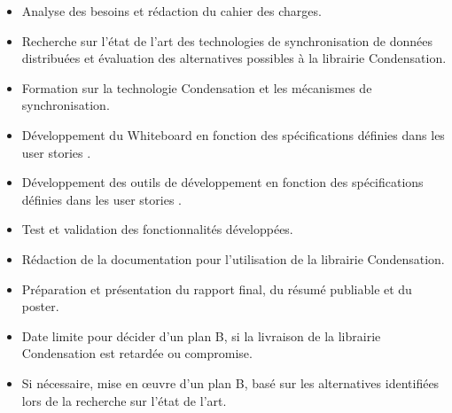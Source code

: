 \begin{itemize}
    \item Analyse des besoins et rédaction du cahier des charges.
    \item Recherche sur l'état de l'art des technologies de synchronisation de données distribuées et évaluation des alternatives possibles à la librairie Condensation.
    \item Formation sur la technologie Condensation et les mécanismes de synchronisation.
    \item Développement du Whiteboard en fonction des spécifications définies dans les user stories .
    \item Développement des outils de développement en fonction des spécifications définies dans les user stories .
    \item Test et validation des fonctionnalités développées.
    \item Rédaction de la documentation pour l'utilisation de la librairie Condensation.
    \item Préparation et présentation du rapport final, du résumé publiable et du poster.
    \item Date limite pour décider d'un plan B, si la livraison de la librairie Condensation est retardée ou compromise.
    \item Si nécessaire, mise en \oe{}uvre d'un plan B, basé sur les alternatives identifiées lors de la recherche sur l'état de l'art.
\end{itemize}

